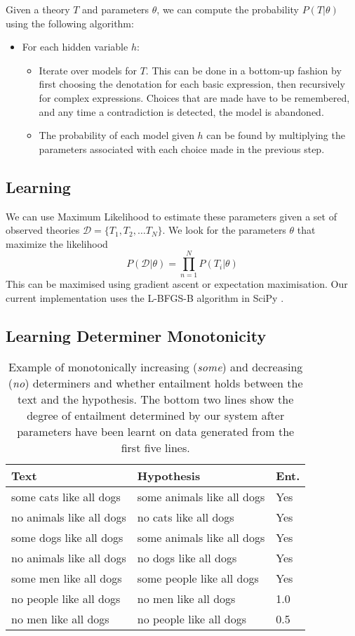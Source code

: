 \documentclass{svmult}
\begin{document}
Given a theory $T$ and parameters $\theta$, we can compute the
probability $P(T|\theta)$ using the following algorithm:
\begin{itemize}
\item For each hidden variable $h$:
\begin{itemize}
\item Iterate over models for $T$. This can be done in a bottom-up
  fashion by first choosing the denotation for each basic expression,
  then recursively for complex expressions. Choices that are made have
  to be remembered, and any time a contradiction is detected, the
  model is abandoned.
\item The probability of each model given $h$ can be found by
  multiplying the parameters associated with each choice made in the
  previous step.
\end{itemize}
\end{itemize}

\subsection{Learning}

We can use Maximum Likelihood to estimate these parameters given a set
of observed theories $\mathcal{D} = \{T_1, T_2, \ldots T_N\}$. We look
for the parameters $\theta$ that maximize the likelihood
$$P(\mathcal{D}|\theta) = \prod_{n=1}^N P(T_i|\theta)$$
This can be maximised using gradient ascent or expectation
maximisation. Our current implementation uses the L-BFGS-B algorithm
in SciPy \cite{Zhu:97}.

\subsection{Learning Determiner Monotonicity}

\begin{table}
\begin{center}
\begin{tabular}{|l|l|l|}
\hline
Text & Hypothesis & Ent.\\
\hline
some cats like all dogs & some animals like all dogs & Yes\\
no animals like all dogs & no cats like all dogs & Yes\\
some dogs like all dogs & some animals like all dogs & Yes\\
no animals like all dogs & no dogs like all dogs & Yes\\
some men like all dogs & some people like all dogs & Yes\\
\hline
no people like all dogs & no men like all dogs & 1.0\\
no men like all dogs & no people like all dogs & 0.5\\
\hline
\end{tabular}
\end{center}
\caption{Example of monotonically increasing (\emph{some}) and decreasing
  (\emph{no}) determiners and whether entailment holds between the text and
  the hypothesis. The bottom two lines show the degree of entailment
  determined by our system after parameters have been learnt on data
  generated from the first five lines.}
\label{table:mono}
\end{table}
\end{document}
